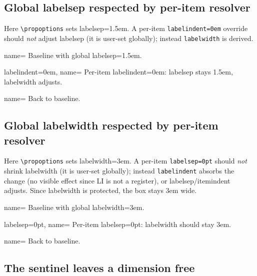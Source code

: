 \documentclass{article}
\newlength{\flabelwd}
\newcommand{\flabel}[1]{%
  \settowidth{\flabelwd}{\textbf{#1}}%
  \ifdim\flabelwd<\dimexpr\labelwidth-2\fboxsep-2\fboxrule\relax
    \setlength{\flabelwd}{\dimexpr\labelwidth-2\fboxsep-2\fboxrule\relax}%
  \fi
  \fbox{\makebox[\flabelwd]{\textbf{#1}\hfill}}}
\begin{document}
\subsection{Global labelsep respected by per-item resolver}

Here \verb|\propoptions| sets labelsep=1.5em.  A per-item
\texttt{labelindent=0em} override should \emph{not} adjust labelsep
(it is user-set globally); instead \texttt{labelwidth} is derived.

\begingroup
{}
\begin{prop}
  \item[name=\flabel{A}] Baseline with global labelsep=1.5em.
  \item[labelindent=0em, name=\flabel{B}]
    Per-item labelindent=0em: labelsep stays 1.5em, labelwidth adjusts.
  \item[name=\flabel{C}] Back to baseline.
\end{prop}
\endgroup

\subsection{Global labelwidth respected by per-item resolver}

Here \verb|\propoptions| sets labelwidth=3em.  A per-item
\texttt{labelsep=0pt} should \emph{not} shrink labelwidth (it is
user-set globally); instead \texttt{labelindent} absorbs the change
(no visible effect since LI is not a register), or labelsep/itemindent
adjusts.  Since labelwidth is protected, the box stays 3em wide.

\begingroup
{}
\begin{prop}
  \item[name=\flabel{A}] Baseline with global labelwidth=3em.
  \item[labelsep=0pt, name=\flabel{B}]
    Per-item labelsep=0pt: labelwidth should stay 3em.
  \item[name=\flabel{C}] Back to baseline.
\end{prop}
\endgroup

\subsection{The sentinel leaves a dimension free}
\end{document}
